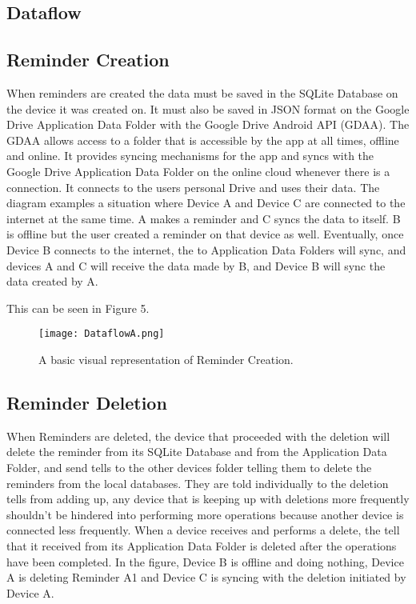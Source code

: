 \documentclass[12pt]{article}
\begin{document}
\subsection{Dataflow}
\subsection{Reminder Creation}
When reminders are created the data must be saved in the SQLite Database on the device it was created on. It must also be saved in JSON format on the Google Drive Application Data Folder with the Google Drive Android API (GDAA). The GDAA allows access to a folder that is accessible by the app at all times, offline and online. It provides syncing mechanisms for the app and syncs with the Google Drive Application Data Folder on the online cloud whenever there is a connection. It connects to the users personal Drive and uses their data. The diagram examples a situation where Device A and Device C are connected to the internet at the same time. A makes a reminder and C syncs the data to itself. B is offline but the user created a reminder on that device as well. Eventually, once Device B connects to the internet, the to Application Data Folders will sync, and devices A and C will receive the data made by B, and Device B will sync the data created by A.

This can be seen in Figure 5.

\begin{figure}[h]
\texttt{[image: DataflowA.png]}
\centering
\caption{A basic visual representation of Reminder Creation.}
\end{figure}


\subsection{Reminder Deletion}
When Reminders are deleted, the device that proceeded with the deletion will delete the reminder from its SQLite Database and from the Application Data Folder, and send tells to the other devices folder telling them to delete the reminders from the local databases. They are told individually to the deletion tells from adding up, any device that is keeping up with deletions more frequently shouldn’t be hindered into performing more operations because another device is connected less frequently. When a device receives and performs a delete, the tell that it received from its Application Data Folder is deleted after the operations have been completed. In the figure, Device B is offline and doing nothing, Device A is deleting Reminder A1 and Device C is syncing with the deletion initiated by Device A.
\end{document}
